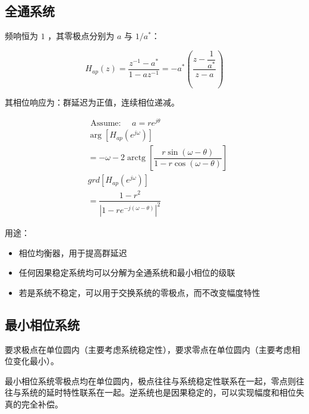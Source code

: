 \documentclass[cn,11pt,chinese,black,simple]{elegantbook}
\begin{document}
\subsection{全通系统}

频响恒为 \(1\) ，其零极点分别为 \(a\) 与 \(1/a^*\)： 

\[
H_{a p}(z)=\dfrac{z^{-1}-a^{*}}{1-a z^{-1}}=-a^{*}\left(\dfrac{z-\dfrac{1}{a^{*}}}{z-a}\right)
\]

其相位响应为：群延迟为正值，连续相位递减。


\[
\begin{aligned}
&\text { Assume: } \quad a=r e^{j \theta}\\
&\arg \left[H_{a p}\left(e^{j \omega}\right)\right]\\
&=-\omega-2 \operatorname{arctg}\left[\dfrac{r \sin (\omega-\theta)}{1-r \cos (\omega-\theta)}\right]\\
&g r d\left[H_{a p}\left(e^{j \omega}\right)\right]\\
&=\dfrac{1-r^{2}}{\left|1-r e^{-j(\omega-\theta)}\right|^{2}}
\end{aligned}
\]

用途：

\begin{itemize}
    \item 相位均衡器，用于提高群延迟
    \item 任何因果稳定系统均可以分解为全通系统和最小相位的级联
    \item 若是系统不稳定，可以用于交换系统的零极点，而不改变幅度特性
\end{itemize}


\subsection{最小相位系统}

要求极点在单位圆内（主要考虑系统稳定性），要求零点在单位圆内（主要考虑相位变化最小）。

最小相位系统零极点均在单位圆内，极点往往与系统稳定性联系在一起，零点则往往与系统的延时特性联系在一起。逆系统也是因果稳定的，可以实现幅度和相位失真的完全补偿。
\end{document}
